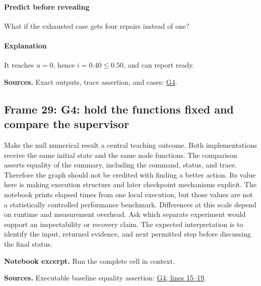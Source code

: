 \documentclass[11pt]{article}
\begin{document}
\paragraph{Predict before revealing}What if the exhausted case gets four repairs instead of one?
\paragraph{Explanation}It reaches \(u=0\), hence \(i=0.40\leq0.50\), and can report ready.
\par\nopagebreak\begin{minipage}{\linewidth}{\footnotesize\color{slate}\textbf{Sources.} Exact outputs, trace assertion, and cases: \href{../Graph_Workflow_Lab.ipynb}{G4}.\par}\end{minipage}\par\medskip
\subsection*{Frame 29: G4: hold the functions fixed and compare the supervisor}
Make the null numerical result a central teaching outcome. Both implementations receive the same initial state and the same node functions. The comparison asserts equality of the summary, including the command, status, and trace. Therefore the graph should not be credited with finding a better action. Its value here is making execution structure and later checkpoint mechanisms explicit. The notebook prints elapsed times from one local execution, but those values are not a statistically controlled performance benchmark. Differences at this scale depend on runtime and measurement overhead. Ask which separate experiment would support an inspectability or recovery claim. The expected interpretation is to identify the input, returned evidence, and next permitted step before discussing the final status.\par
\par\noindent\begin{minipage}{\linewidth}\textbf{Notebook excerpt.} Run the complete cell in context.\par \end{minipage}\par
\par\nopagebreak\begin{minipage}{\linewidth}{\footnotesize\color{slate}\textbf{Sources.} Executable baseline equality assertion: \href{../Graph_Workflow_Lab.ipynb}{G4, lines 15--19}.\par}\end{minipage}\par\medskip
\end{document}

